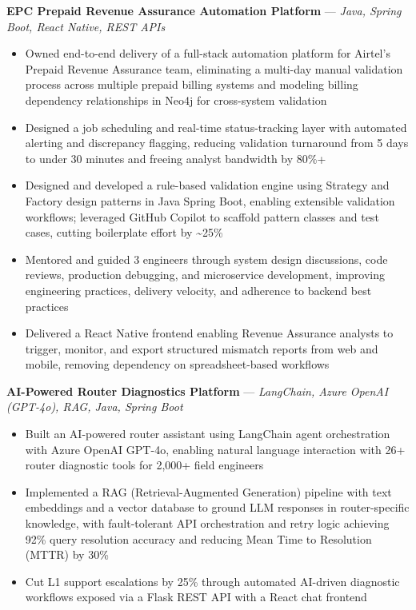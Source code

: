 \documentclass[10.5pt,a4paper]{article}
\newcommand{\proj}[2]{\vspace{4pt}\textbf{#1} \hspace{0.3em}---\hspace{0.3em} \textit{#2}\par\vspace{-1pt}}
\newenvironment{bul}{\begin{itemize}[leftmargin=2.2em,itemsep=2pt,topsep=2pt,parsep=0pt,label=\textbullet]}{\end{itemize}}
\begin{document}
\proj{EPC Prepaid Revenue Assurance Automation Platform}{Java, Spring Boot, React Native, REST APIs}
\begin{bul}
\item Owned end-to-end delivery of a full-stack automation platform for Airtel's Prepaid Revenue Assurance team, eliminating a multi-day manual validation process across multiple prepaid billing systems and modeling billing dependency relationships in Neo4j for cross-system validation
\item Designed a job scheduling and real-time status-tracking layer with automated alerting and discrepancy flagging, reducing validation turnaround from 5 days to under 30 minutes and freeing analyst bandwidth by 80\%+
\item Designed and developed a rule-based validation engine using Strategy and Factory design patterns in Java Spring Boot, enabling extensible validation workflows; leveraged GitHub Copilot to scaffold pattern classes and test cases, cutting boilerplate effort by \textasciitilde25\%
\item Mentored and guided 3 engineers through system design discussions, code reviews, production debugging, and microservice development, improving engineering practices, delivery velocity, and adherence to backend best practices
\item Delivered a React Native frontend enabling Revenue Assurance analysts to trigger, monitor, and export structured mismatch reports from web and mobile, removing dependency on spreadsheet-based workflows
\end{bul}

\proj{AI-Powered Router Diagnostics Platform}{LangChain, Azure OpenAI (GPT-4o), RAG, Java, Spring Boot}
\begin{bul}
\item Built an AI-powered router assistant using LangChain agent orchestration with Azure OpenAI GPT-4o, enabling natural language interaction with 26+ router diagnostic tools for 2,000+ field engineers
\item Implemented a RAG (Retrieval-Augmented Generation) pipeline with text embeddings and a vector database to ground LLM responses in router-specific knowledge, with fault-tolerant API orchestration and retry logic achieving 92\% query resolution accuracy and reducing Mean Time to Resolution (MTTR) by 30\%
\item Cut L1 support escalations by 25\% through automated AI-driven diagnostic workflows exposed via a Flask REST API with a React chat frontend
\end{bul}
\end{document}
